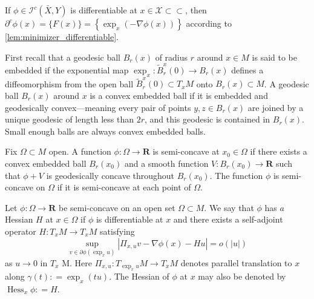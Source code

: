 \begin{example} 
	\label{example:minimizer_differentiable}
	If \( \phi \in \mathcal { I } ^ { c } ( \bar { X } , Y ) \) is differentiable at
	\( x \in \mathcal { X } \subset \subset \),
	then \( \partial ^ { c } \phi ( x ) = \{ F ( x ) \} = \left\{ \exp _ { x } ( - \nabla \phi ( x ) ) \right\} \) according to \cref{lem:minimizer_differentiable}.
\end{example}

First recall that a geodesic ball \( B _ { r } ( x ) \) of radius \( r \) around \( x \in M \) is said to be embedded if the exponential map \( \exp _ { x } : \tilde { B } _ { r } ^ { x } ( 0 ) \rightarrow B _ { r } ( x ) \) defines a diffeomorphism from the open ball \( \tilde { B } _ { r } ^ { x } ( 0 ) \subset T _ { x } M \) onto \( B _ { r } ( x ) \subset M \).
A geodesic ball \( B _ { r } ( x ) \) around \( x \) is a convex embedded ball if it is embedded and geodesically convex---meaning every pair of points \( y , z \in B _ { r } ( x ) \) are joined by a unique geodesic of length less than \( 2 r \), and this geodesic is contained in \( B _ { r } ( x )\).
Small enough balls are always convex embedded balls.

\begin{defn}
	\label{defn:semi-concavity}
	Fix \( \Omega \subset M \) open. A function \( \phi : \Omega \rightarrow \mathbf { R } \) is semi-concave at \( x _ { 0 } \in \Omega \) if there exists a convex embedded ball \( B _ { r } \left( x _ { 0 } \right) \) and a smooth function \( V : B _ { r } \left( x _ { 0 } \right) \rightarrow \mathbf { R } \) such that \( \phi + V \) is geodesically concave throughout \( B _ { r } \left( x _ { 0 } \right) . \) The function \( \phi \) is semi-concave on \( \Omega \) if it is semi-concave at each point of \( \Omega \).
\end{defn}

\begin{defn}[Hessian]
	Let \( \phi : \Omega \rightarrow \mathbf { R } \) be semi-concave on an open set \( \Omega \subset M . \) We say that \( \phi \) has \( a \) Hessian \( H \) at \( x \in \Omega \) if \( \phi \) is differentiable at \( x \)
	and there exists a self-adjoint operator \( H : T _ { x } M \rightarrow T _ { x } M \) satisfying
	\begin{equation}
		\label{defn:hessian}
		\sup _ { v \in \partial \phi \left( \exp _ { x } u \right) } \left| \Pi _ { x , u } v - \nabla \phi ( x ) - H u \right| = o ( | u | )
	\end{equation}
	as \( u \rightarrow 0 \) in \( T _ { x } \) M. Here \( \Pi _ { x , u } : T _ { \exp _ { x } u } M \rightarrow T _ { x } M \) denotes parallel translation to \( x \) along \( \gamma ( t ) : = \exp _ { x } ( t u ) . \) The Hessian of \( \phi \) at \( x \) may also be denoted
	by \( \operatorname { Hess } _ { x } \phi : = H \).
\end{defn}

